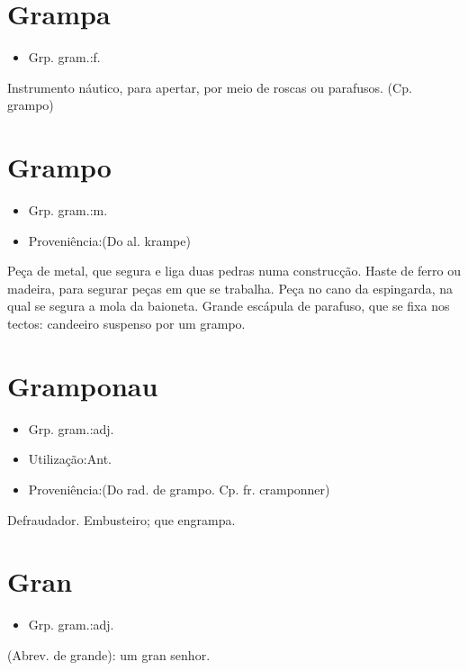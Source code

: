 \section{Grampa}
\begin{itemize}
\item {Grp. gram.:f.}
\end{itemize}
Instrumento náutico, para apertar, por meio de roscas ou parafusos.
(Cp. \textunderscore grampo\textunderscore )
\section{Grampo}
\begin{itemize}
\item {Grp. gram.:m.}
\end{itemize}
\begin{itemize}
\item {Proveniência:(Do al. \textunderscore krampe\textunderscore )}
\end{itemize}
Peça de metal, que segura e liga duas pedras numa construcção.
Haste de ferro ou madeira, para segurar peças em que se trabalha.
Peça no cano da espingarda, na qual se segura a mola da baioneta.
Grande escápula de parafuso, que se fixa nos tectos: \textunderscore candeeiro suspenso por um grampo\textunderscore .
\section{Gramponau}
\begin{itemize}
\item {Grp. gram.:adj.}
\end{itemize}
\begin{itemize}
\item {Utilização:Ant.}
\end{itemize}
\begin{itemize}
\item {Proveniência:(Do rad. de \textunderscore grampo\textunderscore . Cp. fr. \textunderscore cramponner\textunderscore )}
\end{itemize}
Defraudador.
Embusteiro; que engrampa.
\section{Gran}
\begin{itemize}
\item {Grp. gram.:adj.}
\end{itemize}
(Abrev. de \textunderscore grande\textunderscore ): \textunderscore um gran senhor\textunderscore .
